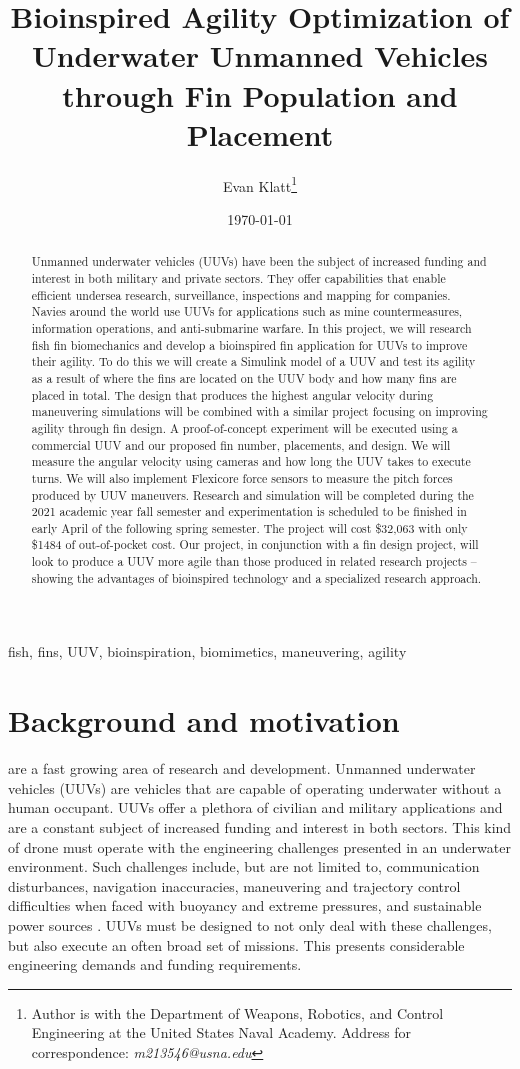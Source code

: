 \documentclass{IEEEtran}
\title{Bioinspired Agility Optimization of Underwater Unmanned Vehicles through Fin Population and Placement}
\author{Evan Klatt\thanks{Author is with the Department of Weapons, Robotics, and Control Engineering at the United States Naval Academy. Address for correspondence: \emph{m213546@usna.edu}}}
\date{\today}
\begin{document}
\maketitle
\begin{abstract}
Unmanned underwater vehicles (UUVs) have been the subject of increased funding and interest in both military and private sectors. They offer capabilities that enable efficient undersea research, surveillance, inspections and mapping for companies. Navies around the world use UUVs for applications such as mine countermeasures, information operations, and anti-submarine warfare. In this project, we will research fish fin biomechanics and develop a bioinspired fin application for UUVs to improve their agility. To do this we will create a Simulink model of a UUV and test its agility as a result of where the fins are located on the UUV body and how many fins are placed in total. The design that produces the highest angular velocity during maneuvering simulations will be combined with a similar project focusing on improving agility through fin design. A proof-of-concept experiment will be executed using a commercial UUV and our proposed fin number, placements, and design. We will measure the angular velocity using cameras and how long the UUV takes to execute turns. We will also implement Flexicore force sensors to measure the pitch forces produced by UUV maneuvers. Research and simulation will be completed during the 2021 academic year fall semester and experimentation is scheduled to be finished in early April of the following spring semester. The project will cost \$32,063 with only \$1484 of out-of-pocket cost. Our project, in conjunction with a fin design project, will look to produce a UUV more agile than those produced in related research projects  -- showing the advantages of bioinspired technology and a specialized research approach.
\end{abstract}

\begin{IEEEkeywords}
fish, fins, UUV, bioinspiration, biomimetics, maneuvering, agility
\end{IEEEkeywords}

\section{Background and motivation}
 are a fast growing area of research and development. Unmanned underwater vehicles (UUVs) are vehicles that are capable of operating underwater without a human occupant. UUVs offer a plethora of civilian and military applications and are a constant subject of increased funding and interest in both sectors. This kind of drone must operate with the engineering challenges presented in an underwater environment. Such challenges include, but are not limited to, communication disturbances, navigation inaccuracies, maneuvering and trajectory control difficulties when faced with buoyancy and extreme pressures, and sustainable power sources \cite{nrc2005autonomous}. UUVs must be designed to not only deal with these challenges, but also execute an often broad set of missions. This presents considerable engineering demands and funding requirements.
\end{document}
